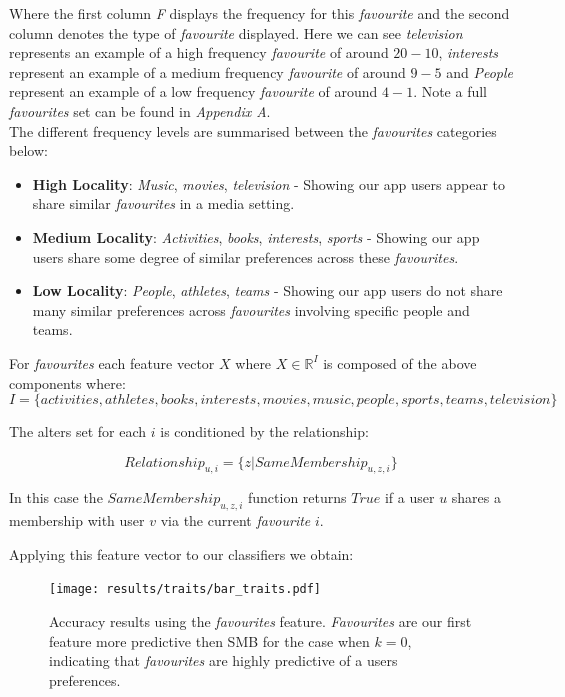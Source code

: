 Where the first column \emph{F} displays the frequency for this \emph{favourite} and the second column denotes the type of \emph{favourite} displayed. 
Here we can see \emph{television} represents an example of a high frequency \emph{favourite} of around $20-10$, \emph{interests} represent an example of a 
medium frequency \emph{favourite} of around $9-5$ and \emph{People} represent an example of a low frequency \emph{favourite} of around $4-1$.
Note a full \emph{favourites} set can be found in \emph{Appendix A}.
\\ 

The different frequency levels are summarised between the \emph{favourites} categories below:
\begin{itemize}
\item \textbf{High Locality}: \emph{Music}, \emph{movies}, \emph{television} - Showing our app users appear to share similar \emph{favourites} in a media 
setting.
\item \textbf{Medium Locality}: \emph{Activities}, \emph{books}, \emph{interests}, \emph{sports} - Showing our app users share some degree of similar preferences 
across these \emph{favourites}.
\item \textbf{Low Locality}: \emph{People}, \emph{athletes}, \emph{teams} - Showing our app users do not share many similar preferences  
across \emph{favourites} involving specific people and teams.
\end{itemize}

For \emph{favourites} each feature vector $X$ where $X \in \mathbb{R}^I$ is composed of the above components where:
\[ I = \{activities, athletes, books, interests, movies, music, people, sports, teams, television\} \]

The alters set for each $i$ is conditioned by the relationship:

\[ Relationship_{u,i} = \{z | SameMembership_{u,z,i}\} \]

In this case the $SameMembership_{u,z,i}$ function returns $True$ if a user $u$ shares a membership with user $v$ via the current \emph{favourite} $i$.

Applying this feature vector to our classifiers we obtain:

\begin{figure}[h]
	\begin{center}
		\texttt{[image: results/traits/bar\_traits.pdf]}
		\caption{Accuracy results using the \emph{favourites} feature. \emph{Favourites} are our first feature more predictive then SMB
				 for the case when $k=0$, indicating that \emph{favourites} are highly predictive of a users preferences.}
	\end{center}
\end{figure}

